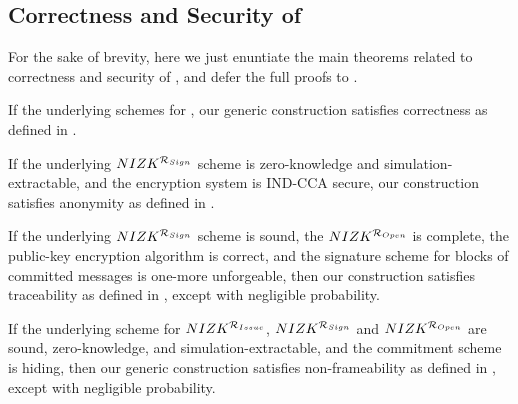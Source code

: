 \subsection{Correctness and Security of \GSACGen}
\label{ssec:security-gsac}

For the sake of brevity, here we just enuntiate the main theorems related to
correctness and security of \GSAC, and defer the full proofs to
.

\begin{theorem}
  \label{thm:correctness-gsac}
  If the underlying schemes for , our generic construction \GSACGen
  satisfies correctness as defined in .
\end{theorem}

\begin{theorem}
  \label{thm:anonymity-gsac}
  If the underlying $NIZK^{\mathcal{R}_{Sign}}$ scheme is zero-knowledge and
  simulation-extractable, and the encryption system is IND-CCA secure,
  our \GSACGen construction satisfies anonymity as defined in
  .
\end{theorem}

\begin{theorem}
  \label{thm:trace-gsac}
  If the underlying $NIZK^{\mathcal{R}_{Sign}}$ scheme is sound, the
  $NIZK^{\mathcal{R}_{Open}}$ is  complete, the public-key encryption algorithm
  is correct, and the signature scheme for blocks of committed messages is
  one-more unforgeable, then our \GSACGen construction satisfies traceability as
  defined in , except with negligible
  probability.
\end{theorem}

\begin{theorem}
  \label{thm:frame-gsac}
  If the underlying scheme for $NIZK^{\mathcal{R}_{Issue}}$,
  $NIZK^{\mathcal{R}_{Sign}}$ and $NIZK^{\mathcal{R}_{Open}}$ are sound,
  zero-knowledge, and simulation-extractable, and
  the commitment scheme \C is hiding, then our generic \GSACGen construction
  satisfies non-frameability as defined in , except with
  negligible probability.
\end{theorem}

